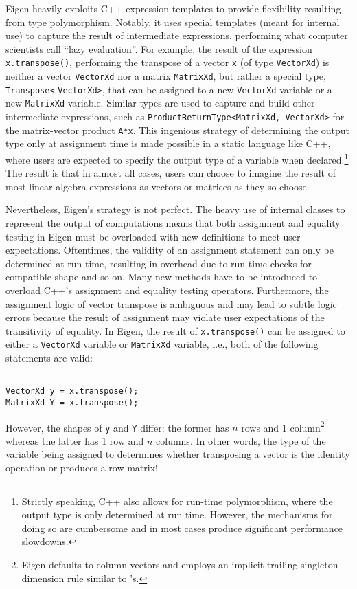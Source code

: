 Eigen heavily exploits C++ expression templates to provide flexibility
resulting from type polymorphism. Notably, it uses special templates (meant for
internal use) to capture the result of intermediate expressions, performing
what computer scientists call ``lazy evaluation''. For example, the result of
the expression \verb`x.transpose()`, performing the transpose of a vector
\verb`x` (of type \verb`VectorXd`) is neither a vector \verb`VectorXd` nor a
matrix \verb`MatrixXd`, but rather a special type, \verb`Transpose<`
\verb`VectorXd>`, that can be assigned to a new \verb`VectorXd` variable or a
new \verb`MatrixXd` variable. Similar types are used to capture and build other
intermediate expressions, such as \verb`ProductReturnType<MatrixXd, VectorXd>`
for the matrix-vector product \verb`A*x`.  This ingenious strategy of
determining the output type only at assignment time is made possible in a
static language like C++, where users are expected to specify the output type
of a variable when declared.\footnote{Strictly speaking, C++ also allows for
run-time polymorphism, where the output type is only determined at run time.
However, the mechanisms for doing so are cumbersome and in most cases produce
significant performance slowdowns.} The result is that in almost all cases,
users can choose to imagine the result of most linear algebra expressions as
vectors or matrices as they so choose.

Nevertheless, Eigen's strategy is not perfect. The heavy use of internal
classes to represent the output of computations means that both assignment and
equality testing in Eigen must be overloaded with new definitions to meet user
expectations. Oftentimes, the validity of an assignment statement can only be
determined at run time, resulting in overhead due to run time checks for
compatible shape and so on. Many new methods have to be introduced to overload
C++'s assignment and equality testing operators. Furthermore, the assignment
logic of vector transpose is ambiguous and may lead to subtle logic errors
because the result of assignment may violate user expectations of the
transitivity of equality. In Eigen, the result of \verb`x.transpose()` can be
assigned to either a \verb`VectorXd` variable or \verb`MatrixXd` variable,
i.e., both of the following statements are valid:

\begin{verbatim}

VectorXd y = x.transpose();
MatrixXd Y = x.transpose();

\end{verbatim}
%
However, the shapes of \verb`y` and \verb`Y` differ: the former has $n$ rows
and 1 column\footnote{Eigen defaults to column vectors and employs an implicit
trailing singleton dimension rule similar to 's.} whereas the latter
has 1 row and $n$ columns. In other words, the type of the variable being
assigned to determines whether transposing a vector is the identity operation
or produces a row matrix!


